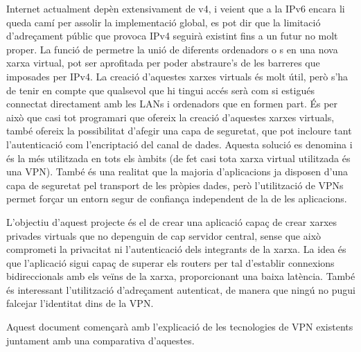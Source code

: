 Internet actualment depèn extensivament de v4, i veient que a la IPv6 encara li queda camí per assolir la implementació global, es pot dir que la limitació d'adreçament públic que provoca IPv4 seguirà existint fins a un futur no molt proper. La funció de permetre la unió de diferents ordenadors o s en una nova xarxa virtual, pot ser aprofitada per poder abstraure's de les barreres que imposades per IPv4. La creació d'aquestes xarxes virtuals és molt útil, però s'ha de tenir en compte que qualsevol que hi tingui accés serà com si estigués connectat directament amb les LANs i ordenadors que en formen part. És per això que casi tot programari que ofereix la creació d'aquestes xarxes virtuals, també ofereix la possibilitat d'afegir una capa de seguretat, que pot incloure tant l'autenticació com l'encriptació del canal de dades. Aquesta solució es denomina  i és la més utilitzada en tots els àmbits (de fet casi tota xarxa virtual utilitzada és una VPN).
També és una realitat que la majoria d'aplicacions ja disposen d'una capa de seguretat pel transport de les pròpies dades, però l'utilització de VPNs permet forçar un entorn segur de confiança independent de la de les aplicacions. 

L'objectiu d'aquest projecte és el de crear una aplicació capaç de crear xarxes privades virtuals que no depenguin de cap servidor central, sense que això comprometi la privacitat ni l'autenticació dels integrants de la xarxa. La idea és que l'aplicació sigui capaç de superar els routers  per tal d'establir connexions bidireccionals amb els veïns de la xarxa, proporcionant una baixa latència. També és interessant l'utilització d'adreçament autenticat, de manera que ningú no pugui falcejar l'identitat dins de la VPN.

Aquest document començarà amb l'explicació de les tecnologies de VPN existents juntament amb una comparativa d'aquestes.
